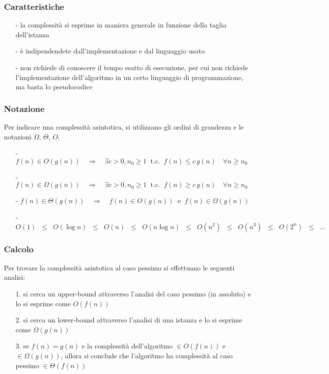\documentclass[a4paper]{article}
\begin{document}
\subsubsection*{Caratteristiche}
\begin{itemize}[topsep=3pt, itemsep=0pt]
	\item[-] la complessità si esprime in maniera generale in funzione della taglia dell'istanza
	\item[-] è indipendendete dall'implementazione e dal linguaggio usato
	\item[-] non richiede di conoscere il tempo esatto di esecuzione, per cui non richiede l'implementazione dell'algoritmo in
	un certo linguaggio di programmazione, ma basta lo pseudocodice
\end{itemize}

\subsubsection*{Notazione}
Per indicare una complessità asintotica, si utilizzano gli ordini di grandezza e le notazioni \(\Omega\), \(\Theta\), \(O\).
\begin{itemize}[topsep=3pt, itemsep=0pt]
	\item[-] \(f(n) \in O(g(n)) \quad \Rightarrow \quad \exists c > 0, n_0 \geq 1 \;\; \text{t.c.} \;\; f(n) \leq c \, g(n) \quad \forall n \geq n_0\)
	\item[-] \(f(n) \in \Omega(g(n)) \quad \Rightarrow \quad \exists c > 0, n_0 \geq 1 \;\; \text{t.c.} \;\; f(n) \geq c \, g(n) \quad \forall n \geq n_0\)
	\item[-] \(f(n) \in \Theta(g(n)) \quad \Rightarrow \quad f(n) \in O(g(n)) \;\; \text{e} \;\; f(n) \in \Omega(g(n))\)
	\item[-] \(O(1) \; \; \leq \; \; O(\log n) \; \; \leq \; \; O(n) \; \; \leq \; \; O(n \log n) \; \; \leq \; \; O(n^2) \; \; \leq \; \; O(n^3) \; \; \leq \; \; O(2^n) \;\; \leq \;\; \dots\)
\end{itemize}

\subsubsection*{Calcolo}
Per trovare la complessità asintotica al caso pessimo si effettuano le seguenti analisi:
\begin{itemize}[topsep=3pt, itemsep=0pt]
	\item[1.] si cerca un upper-bound attraverso l'analisi del caso pessimo (in assoluto) e lo si esprime come \(O(f(n))\)
	\item[2.] si cerca un lower-bound attraverso l'analisi di una istanza  e lo si esprime come \(\Omega(g(n))\)
	\item[3.] se \(f(n) = g(n)\) e la complessità dell'algoritmo \(\in O(f(n))\) e \(\in \Omega(g(n))\), allora si conclude che
	l'algoritmo ha complessità al caso pessimo \(\in \Theta(f(n))\)
\end{itemize}
\end{document}
